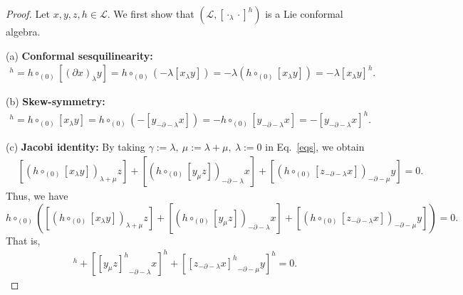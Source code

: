 \documentclass[11pt,letterpaper,reqno]{amsart}
\theoremstyle{definition}
\numberwithin{equation}{section}
\begin{document}
\begin{proof}
Let $x,y,z,h\in \mathcal{L}$. We first show that $(\mathcal{L}, [\cdot_{\lambda}\cdot]^h)$ is a Lie conformal algebra.

   (a) {\bf Conformal sesquilinearity:}
   \begin{align*}
      [(\partial x)_{\lambda}y]^h=h\circ_{(0)}[(\partial x)_{\lambda}y]=h\circ_{(0)}(-\lambda[x_{\lambda}y])=-\lambda (h\circ_{(0)}[x_{\lambda}y])=-\lambda [x_{\lambda}y]^h.
   \end{align*}

   (b) {\bf Skew-symmetry:}
   \begin{align*}
      [x_{\lambda}y]^h=h\circ_{(0)}[x_{\lambda}y]=h\circ_{(0)}(-[y_{-\partial-\lambda}x])=-h\circ_{(0)}[y_{-\partial-\lambda}x]=-[y_{-\partial-\lambda}x]^h.
   \end{align*}

   (c) {\bf Jacobi identity:} By taking $\gamma:=\lambda, ~\mu:=\lambda+\mu,~\lambda:=0$ in Eq.~\eqref{eqs}, we obtain
   \begin{align*}
      &[(h\circ_{(0)}[x_{\lambda}y])_{\lambda+\mu}z]+[(h\circ_{(0)}[y_{\mu}z])_{-\partial-\lambda}x]+[(h\circ_{(0)}[z_{-\partial-\lambda}x])_{-\partial-\mu}y]=0.
   \end{align*}
   Thus, we have
   $$h\circ_{(0)}([(h\circ_{(0)}[x_{\lambda}y])_{\lambda+\mu}z]+[(h\circ_{(0)}[y_{\mu}z])_{-\partial-\lambda}x]+[(h\circ_{(0)}[z_{-\partial-\lambda}x])_{-\partial-\mu}y])=0.$$
    That is,
   \begin{align*}
      [{[x_{\lambda}y]^h}_{\lambda+\mu}z]^h+[{[y_{\mu}z]^h}_{-\partial-\lambda}x]^h+[{[z_{-\partial-\lambda}x]^h}_{-\partial-\mu}y]^h=0.
   \end{align*}


\end{proof}
\end{document}
